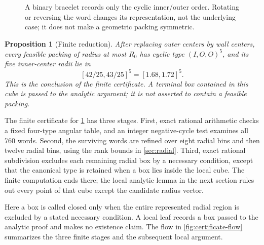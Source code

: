 \documentclass[11pt]{article}
\newtheorem{proposition}[theorem]{Proposition}
\theoremstyle{definition}
\begin{document}
\begin{figure}[htbp]
\centering
{}
\caption{A binary bracelet records only the cyclic inner/outer order. Rotating or reversing the word changes its representation, not the underlying case; it does not make a geometric packing symmetric.}
\label{fig:bracelet}
\end{figure}

\begin{proposition}[Finite reduction]\label{prop:finite-reduction}
After replacing outer centers by wall centers, every feasible packing of radius at most $R_0$ has cyclic type $(I,O,O)^5$, and its five inner-center radii lie in
\[
 [42/25,43/25]^5=[1.68,1.72]^5.
\]
This is the conclusion of the finite certificate. A terminal box contained in this cube is passed to the analytic argument; it is not asserted to contain a feasible packing.
\end{proposition}

The finite certificate for \cref{prop:finite-reduction} has three stages. First, exact rational arithmetic checks a fixed four-type angular table, and an integer negative-cycle test examines all 760 words. Second, the surviving words are refined over eight radial bins and then twelve radial bins, using the rank bounds in \cref{sec:radial}. Third, exact rational subdivision excludes each remaining radial box by a necessary condition, except that the canonical type is retained when a box lies inside the local cube. The finite computation ends there; the local analytic lemma in the next section rules out every point of that cube except the candidate radius vector.

Here a box is called closed only when the entire represented radial region is excluded by a stated necessary condition. A local leaf records a box passed to the analytic proof and makes no existence claim. The flow in \cref{fig:certificate-flow} summarizes the three finite stages and the subsequent local argument.
\end{document}
